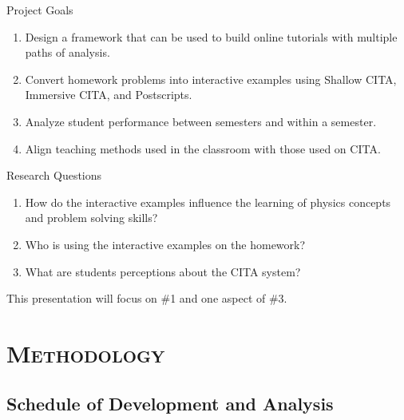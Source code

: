 \documentclass[xcolor=x11names,compress]{beamer}
\begin{document}
\begin{frame}{Project Goals}
	\begin{enumerate}
		\item Design a framework that can be used to build online tutorials with multiple paths of analysis.
		\item Convert homework problems into interactive examples using Shallow CITA, Immersive CITA, and Postscripts.
		\item Analyze student performance between semesters and within a semester.
		\item Align teaching methods used in the classroom with those used on CITA.
	\end{enumerate}
\end{frame}

\begin{frame}{Research Questions}
	\begin{enumerate}
		\item How do the interactive examples influence the learning of physics concepts and problem solving skills?
		\vspace{5mm}
		\item Who is using the interactive examples on the homework?
		\vspace{5mm}
		\item What are students perceptions about the CITA system?
	\end{enumerate}
	\vspace{5mm}
	This presentation will focus on \#1 and one aspect of \#3.
\end{frame}


\section{\scshape Methodology}

\subsection{Schedule of Development and Analysis}
\end{document}
